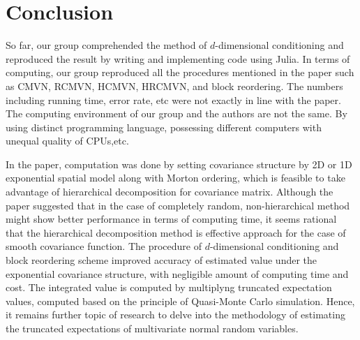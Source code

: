 \section{Conclusion}

So far, our group comprehended the method of $d$-dimensional conditioning and reproduced the result by writing and implementing code using Julia. In terms of computing, our group reproduced all the procedures mentioned in the paper such as CMVN, RCMVN, HCMVN, HRCMVN, and block reordering. The numbers including running time, error rate, etc were not exactly in line with the paper. The computing environment of our group and the authors are not the same. By using distinct programming language, possessing different computers with unequal quality of CPUs,etc. 

In the paper, computation was done by setting covariance structure by 2D or 1D exponential spatial model along with Morton ordering, which is feasible to take advantage of hierarchical decomposition for covariance matrix. Although the paper suggested that in the case of completely random, non-hierarchical method might show better performance in terms of computing time, it seems rational that the hierarchical decomposition method is effective approach for the case of smooth covariance function. The procedure of $d$-dimensional conditioning and block reordering scheme improved accuracy of estimated value under the exponential covariance structure, with negligible amount of computing time and cost. The integrated value is computed by multiplyng truncated expectation values, computed based on the principle of Quasi-Monte Carlo simulation. Hence, it remains further topic of research to delve into the methodology of estimating the truncated expectations of multivariate normal random variables. 